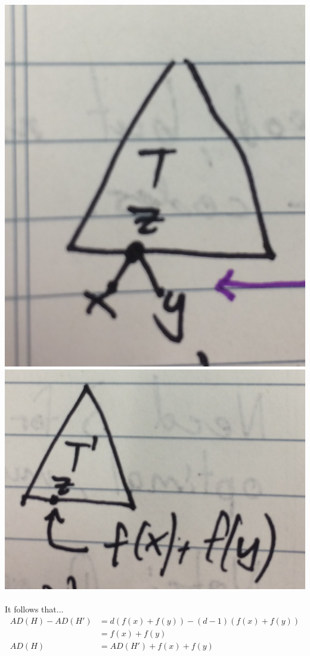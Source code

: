 \documentclass[12pt]{article}
\begin{document}
\includegraphics[scale=0.125]{lec4-4}\includegraphics[scale=0.125]{lec4-5}
\\
\\
It follows that...
\begin{align*}
	AD(H) - AD(H') &= d(f(x) + f(y)) - (d-1)(f(x) + f(y))\\
	&= f(x)+f(y)\\
	AD(H) &= AD(H') + f(x) + f(y)\\
\end{align*}
\end{document}
